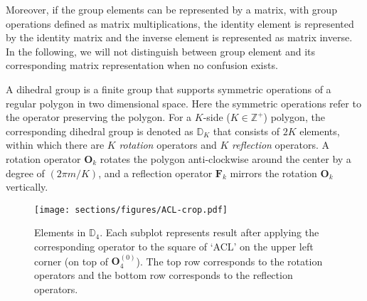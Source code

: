 \documentclass[11pt,a4paper]{article}
\begin{document}
Moreover, if the group elements can be represented by a matrix, with group operations defined as matrix multiplications, the identity element is represented by the identity matrix and the inverse element is represented as matrix inverse. In the following, we will not distinguish between group element and its corresponding matrix representation when no confusion exists.

A dihedral group is a finite group that supports symmetric operations of a regular polygon in two dimensional space. Here the symmetric operations refer to the operator preserving the polygon. For a $K$-side ($K\in\mathbb{Z}^{+}$) polygon, the corresponding dihedral group is denoted as $\mathbb{D}_{K}$ that consists of $2K$ elements, within which there are $K$ \emph{rotation} operators and $K$ \emph{reflection} operators. A rotation operator $\bm{O}_{k}$ rotates the polygon anti-clockwise around the center by a degree of ${(2\pi m / K)}$, and a reflection operator $\bm{F}_{k}$ mirrors the rotation $\bm{O}_{k}$ vertically.

\begin{figure}[ht]
\begin{centering}
\texttt{[image: sections/figures/ACL-crop.pdf]}
\par\end{centering}
\caption{Elements in $\mathbb{D}_{4}$. Each subplot represents result after applying the corresponding operator to the square of `ACL' on the upper left corner (on top of $\bm{O}_4^{(0)}$). The top row corresponds to the rotation operators and the bottom row corresponds to the reflection operators.} \label{figure: dihedral}
\end{figure}
\end{document}
